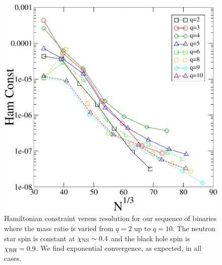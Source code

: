 \begin{figure}
\includegraphics[width=0.95\columnwidth]{chap4/qSeqHam}
\caption[Hamiltonian constraint for the $q$ sequence.]{\label{fig:qSeqHam}Hamiltonian constraint versus resolution for our sequence of binaries where the mass ratio is varied from $q=2$ up to $q=10$. The neutron star spin is constant at $\chi_{\rm NS}\sim 0.4$ and the black hole spin is $\chi_{\rm BH}=0.9$. We find exponential convergence, as expected, in all cases.}
\end{figure}

